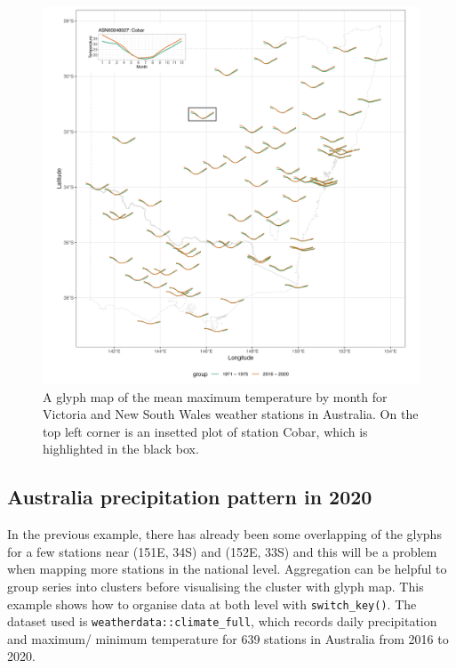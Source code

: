 \documentclass[
]{jss}
\begin{document}
\begin{CodeChunk}
\begin{figure}

{\centering \includegraphics[width=1\linewidth,height=0.7\textheight]{figures/basic-manip} 

}

\caption[A glyph map of the mean maximum temperature by month for Victoria and New South Wales weather stations in Australia]{A glyph map of the mean maximum temperature by month for Victoria and New South Wales weather stations in Australia. On the top left corner is an insetted plot of station Cobar, which is highlighted in the black box.}\label{fig:basic-manip}
\end{figure}
\end{CodeChunk}

\hypertarget{australia-precipitation-pattern-in-2020}{%
\subsection{Australia precipitation pattern in
2020}\label{australia-precipitation-pattern-in-2020}}

In the previous example, there has already been some overlapping of the
glyphs for a few stations near (151E, 34S) and (152E, 33S) and this will
be a problem when mapping more stations in the national level.
Aggregation can be helpful to group series into clusters before
visualising the cluster with glyph map. This example shows how to
organise data at both level with \texttt{switch\_key()}. The dataset
used is \texttt{weatherdata::climate\_full}, which records daily
precipitation and maximum/ minimum temperature for 639 stations in
Australia from 2016 to 2020.
\end{document}
